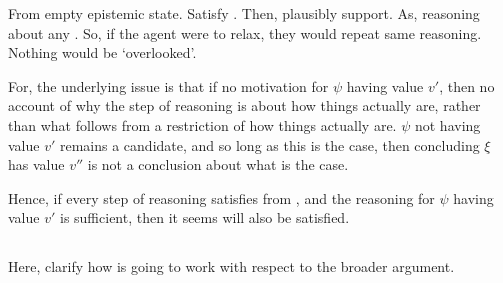 \begin{note}
  From empty epistemic state.
  Satisfy \ideaCS{}.
  Then, plausibly support.
  As, reasoning about any \requ{}.
  So, if the agent were to relax, they would repeat same reasoning.
  Nothing would be `overlooked'.
\end{note}

\begin{note}
  \color{red}
  For, the underlying issue is that if no motivation for \(\psi\) having value \(v'\), then no account of why the step of reasoning is about how things actually are, rather than what follows from a restriction of how things actually are.
  \(\psi\) not having value \(v'\) remains a candidate, and so long as this is the case, then concluding \(\xi\) has value \(v''\) is not a conclusion about what is the case.

  Hence, if every step of reasoning satisfies \ideaCS{} from \epPAd{} \world{}, and the reasoning for \(\psi\) having value \(v'\) is sufficient, then it seems \ideaS{} will also be satisfied.
\end{note}

\subsection{\FCS{}}
\label{sec:fcs-2}

\begin{note}
  \color{red}
  Here, clarify how \ideaCS{} is going to work with respect to the broader argument.
\end{note}

